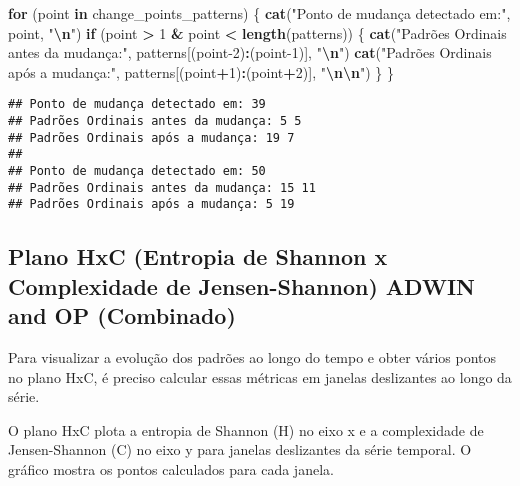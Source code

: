 \documentclass[
]{article}
\newenvironment{Shaded}{\begin{snugshade}}{\end{snugshade}}
\newcommand{\ControlFlowTok}[1]{\textcolor[rgb]{0.13,0.29,0.53}{\textbf{#1}}}
\newcommand{\DecValTok}[1]{\textcolor[rgb]{0.00,0.00,0.81}{#1}}
\newcommand{\FunctionTok}[1]{\textcolor[rgb]{0.13,0.29,0.53}{\textbf{#1}}}
\newcommand{\NormalTok}[1]{#1}
\newcommand{\SpecialCharTok}[1]{\textcolor[rgb]{0.81,0.36,0.00}{\textbf{#1}}}
\newcommand{\StringTok}[1]{\textcolor[rgb]{0.31,0.60,0.02}{#1}}
\begin{document}
\begin{Shaded}
\begin{Highlighting}[]
\ControlFlowTok{for}\NormalTok{ (point }\ControlFlowTok{in}\NormalTok{ change\_points\_patterns) \{}
  \FunctionTok{cat}\NormalTok{(}\StringTok{"Ponto de mudança detectado em:"}\NormalTok{, point, }\StringTok{"}\SpecialCharTok{\textbackslash{}n}\StringTok{"}\NormalTok{)}
  \ControlFlowTok{if}\NormalTok{ (point }\SpecialCharTok{\textgreater{}} \DecValTok{1} \SpecialCharTok{\&}\NormalTok{ point }\SpecialCharTok{\textless{}} \FunctionTok{length}\NormalTok{(patterns)) \{}
    \FunctionTok{cat}\NormalTok{(}\StringTok{"Padrões Ordinais antes da mudança:"}\NormalTok{, patterns[(point}\DecValTok{{-}2}\NormalTok{)}\SpecialCharTok{:}\NormalTok{(point}\DecValTok{{-}1}\NormalTok{)], }\StringTok{"}\SpecialCharTok{\textbackslash{}n}\StringTok{"}\NormalTok{)}
    \FunctionTok{cat}\NormalTok{(}\StringTok{"Padrões Ordinais após a mudança:"}\NormalTok{, patterns[(point}\SpecialCharTok{+}\DecValTok{1}\NormalTok{)}\SpecialCharTok{:}\NormalTok{(point}\SpecialCharTok{+}\DecValTok{2}\NormalTok{)], }\StringTok{"}\SpecialCharTok{\textbackslash{}n\textbackslash{}n}\StringTok{"}\NormalTok{)}
\NormalTok{  \}}
\NormalTok{\}}
\end{Highlighting}
\end{Shaded}

\begin{verbatim}
## Ponto de mudança detectado em: 39 
## Padrões Ordinais antes da mudança: 5 5 
## Padrões Ordinais após a mudança: 19 7 
## 
## Ponto de mudança detectado em: 50 
## Padrões Ordinais antes da mudança: 15 11 
## Padrões Ordinais após a mudança: 5 19
\end{verbatim}

\hypertarget{plano-hxc-entropia-de-shannon-x-complexidade-de-jensen-shannon-adwin-and-op-combinado}{%
\subsection{Plano HxC (Entropia de Shannon x Complexidade de
Jensen-Shannon) ADWIN and OP
(Combinado)}\label{plano-hxc-entropia-de-shannon-x-complexidade-de-jensen-shannon-adwin-and-op-combinado}}

Para visualizar a evolução dos padrões ao longo do tempo e obter vários
pontos no plano HxC, é preciso calcular essas métricas em janelas
deslizantes ao longo da série.

O plano HxC plota a entropia de Shannon (H) no eixo x e a complexidade
de Jensen-Shannon (C) no eixo y para janelas deslizantes da série
temporal. O gráfico mostra os pontos calculados para cada janela.
\end{document}
